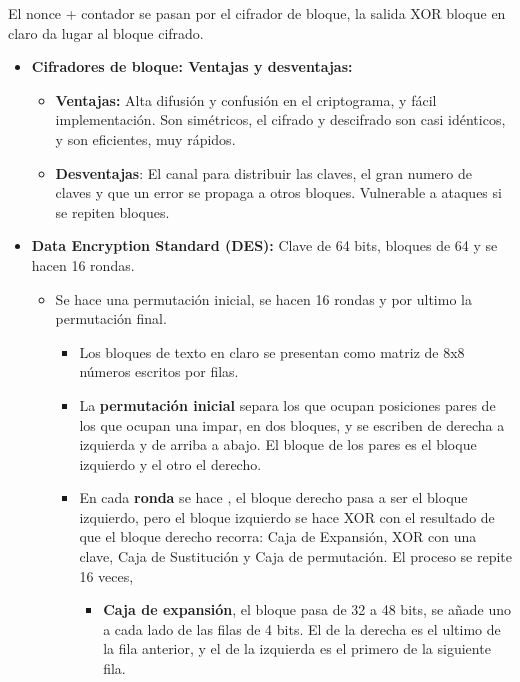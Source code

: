 \documentclass[12pt, twoside, openright]{report} %
\begin{document}
  El nonce + contador se pasan por el cifrador de bloque, la salida XOR
  bloque en claro da lugar al bloque cifrado.
\pagebreak
  \begin{itemize}
  \item \textbf{Cifradores de bloque: Ventajas y desventajas:}
    

    \begin{itemize}
    \item \textbf{Ventajas:} Alta difusión y confusión en el criptograma, y
      fácil implementación. Son simétricos, el cifrado y descifrado son
      casi idénticos, y son eficientes, muy rápidos.
      
    \item \textbf{Desventajas}: El canal para distribuir las claves, el gran
      numero de claves y que un error se propaga a otros bloques.
      Vulnerable a ataques si se repiten bloques.
      
    \end{itemize}
  \item \textbf{Data Encryption Standard (DES):} Clave de 64 bits, bloques
    de 64 y se hacen 16 rondas.
    

    \begin{itemize}
    \item Se hace una permutación inicial, se hacen 16 rondas y por ultimo
      la permutación final.
      

      \begin{itemize}
      \item Los bloques de texto en claro se presentan como matriz de 8x8
        números escritos por filas.
        
      \item La \textbf{permutación inicial} separa los que ocupan posiciones
        pares de los que ocupan una impar, en dos bloques, y se escriben
        de derecha a izquierda y de arriba a abajo. El bloque de los
        pares es el bloque izquierdo y el otro el derecho.
        
      \item En cada \textbf{ronda} se hace , el bloque derecho pasa a ser el
        bloque izquierdo, pero el bloque izquierdo se hace XOR con el
        resultado de que el bloque derecho recorra: Caja de Expansión,
        XOR con una clave, Caja de Sustitución y Caja de permutación. El
        proceso se repite 16 veces,
        

        \begin{itemize}
        \item \textbf{Caja de expansión}, el bloque pasa de 32 a 48 bits, se
          añade uno a cada lado de las filas de 4 bits. El de la derecha
          es el ultimo de la fila anterior, y el de la izquierda es el
          primero de la siguiente fila.
          

\end{itemize}
\end{itemize}
\end{itemize}
\end{itemize}
\end{document}
